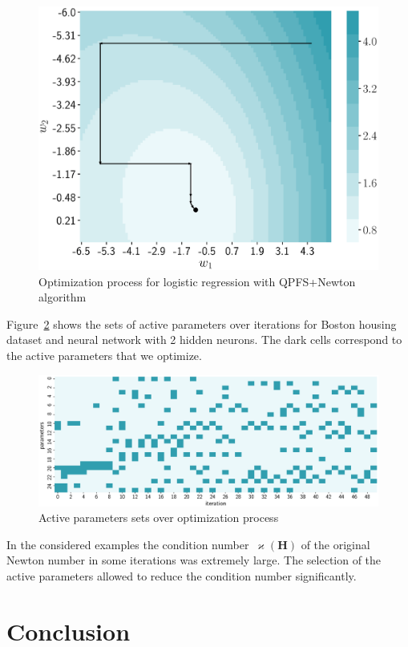 \documentclass[a4paper,12pt]{article}
\renewcommand{\kappa}{\ensuremath{\varkappa}}
\theoremstyle{plain} %
\theoremstyle{definition} %
\theoremstyle{remark} %
\newcommand{\bH}{\mathbf{H}}
\begin{document}
	\begin{figure}
		\centering
		\includegraphics[width=0.6\linewidth]{figs/irls_qpfs_2d.eps}	 
		\caption{Optimization process for logistic regression with QPFS+Newton algorithm}
		\label{fig:irls_qpfs_2d}
	\end{figure}

	Figure~\ref{fig:active_params_wrt_iters} shows the sets of active parameters over iterations for Boston housing dataset and neural network with 2 hidden neurons. The dark cells correspond to the active parameters that we optimize.

	\begin{figure}[!h]	
		\centering
		\includegraphics[width=\linewidth]{figs/active_params_wrt_iters.eps}	 
		\caption{Active parameters sets over optimization process}
		\label{fig:active_params_wrt_iters}
	\end{figure}
	
	In the considered examples the condition number~$\kappa (\bH)$ of the original Newton number in some iterations was extremely large. 
	The selection of the active parameters allowed to reduce the condition number significantly. 
	

	\section*{Conclusion}

  
  
  
	
\end{document}
